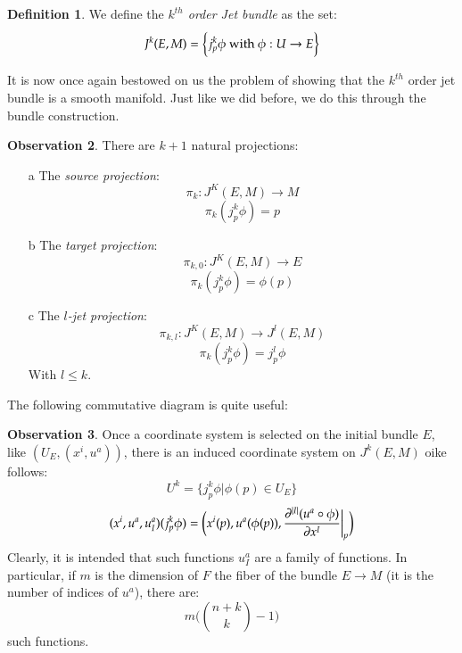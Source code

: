 \documentclass[12pt,a4paper]{report}
\theoremstyle{definition}
\newtheorem{Def}{Definition}[chapter]
\theoremstyle{Theorem}
\theoremstyle{break}
\theoremstyle{definition}
\newtheorem{Obs}[Def]{Observation}
\begin{document}
	\begin{Def}
		We define the \textit{$k^{th}$ order Jet bundle} as the set:
		$$J^k(E,M)=\bigg\{j^k_p\phi \hbox{ with } \phi:U\rightarrow E\bigg\}$$
	\end{Def}
	It is now once again bestowed on us the problem of showing that the $k^{th}$ order jet bundle is a smooth manifold. Just like we did before, we do this through the bundle construction.
	\begin{Obs}
		There are $k+1$ natural projections:
		\begin{itemize}
			\item[a] The \textit{source projection}:
			$$\pi_{k}:J^K(E,M)\longrightarrow M$$
			$$\pi_k(j^k_p\phi)=p$$
			\item[b] The \textit{target projection}:
			$$\pi_{k,0}:J^K(E,M)\longrightarrow E$$
			$$\pi_k(j^k_p\phi)=\phi(p)$$
			\item[c] The \textit{$l$-jet projection}:
			$$\pi_{k,l}:J^K(E,M)\longrightarrow J^l(E,M)$$
			$$\pi_k(j^k_p\phi)=j^l_p\phi$$
			With $l\leq k$.
		\end{itemize}
		The following commutative diagram is quite useful:
		\begin{center}
		\end{center}
	\end{Obs}
	\begin{Obs}
		Once a coordinate system is selected on the initial bundle $E$, like $(U_E,(x^i,u^a))$, there is an induced coordinate system on $J^k(E,M)$ oike follows:
		$$U^k=\big\{j^k_p\phi\big|\phi(p)\in U_E\big\}$$
		$$(x^i,u^a,u^a_I)(j^k_p\phi)=\bigg(x^i(p),u^a(\phi(p)),{\partial^{|I|}(u^a\circ \phi)\over \partial x^I}\bigg|_p\bigg)$$
		Clearly, it is intended that such functions $u^a_I$ are a family of functions. In particular, if $m$ is the dimension of $F$ the fiber of the bundle $E\rightarrow M$ (it is the number of indices of $u^a$), there are:
		$$m\bigg({n+k\choose k}-1\bigg)$$
		such functions.
	\end{Obs}
\end{document}
